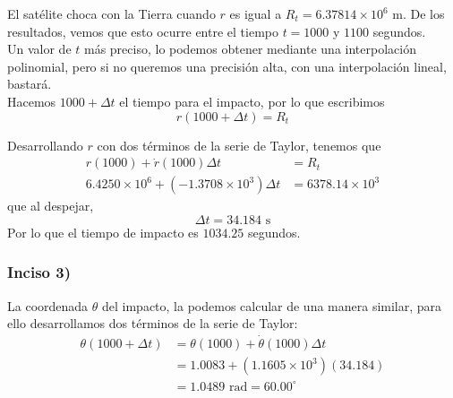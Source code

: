 \begin{frame}
El satélite choca con la Tierra cuando $r$ es igual a $R_{t}=6.37814 \times 10^{6}$ m. De los resultados, vemos que esto ocurre entre el tiempo $t= 1000$ y $1100$ segundos.
\\
\medskip
Un valor de $t$ más preciso, lo podemos obtener mediante una interpolación polinomial, pero si no queremos una precisión alta, con una interpolación lineal, bastará.
\\
\medskip
Hacemos $1000 + \Delta t$ el tiempo para el impacto, por lo que escribimos
\[ r(1000 + \Delta t) = R_{t} \]
\end{frame}
\begin{frame}
Desarrollando $r$ con dos términos de la serie de Taylor, tenemos que
\[ \begin{split} 
r(1000) + \dot{r}(1000) \Delta t &= R_{t} \\
6.4250 \times 10^{6} + (-1.3708 \times 10^{3}) \Delta t &= 6378.14 \times 10^{3}
\end{split} \]
que al despejar, 
\[ \Delta t = 34.184 \mbox{ s} \]
Por lo que el tiempo de impacto es $1034.25$ segundos.
\end{frame}
\begin{frame}
\frametitle{Inciso 3)}
La coordenada $\theta$ del impacto, la podemos calcular de una manera similar, para ello desarrollamos dos términos de la serie de Taylor:
\[ \begin{split}
\theta(1000 + \Delta t) &= \theta(1000) + \dot{\theta}(1000)\Delta t \\
 &= 1.0083 + (1.1605 \times 10^{3} )(34.184) \\
 &= 1.0489 \mbox{ rad} = 60.00^{\circ}
\end{split} \]
\end{frame}
